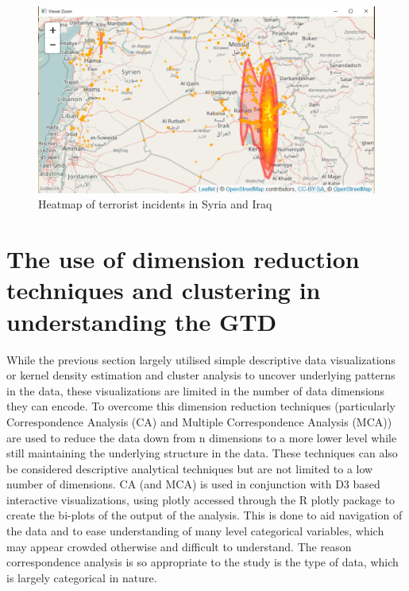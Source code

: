 \begin{figure}[t]
\includegraphics[width=15cm]{Peters_experiment_markdown_files/figure-latex/Capture_KDE_Leaflet_2015_Deaths_Iraq_Syria.png}
\caption{Heatmap of terrorist incidents in Syria and Iraq}
\label{fig:iraqsyriakde}
\centering
\end{figure}
 
\section{The use of dimension reduction techniques and clustering in understanding the GTD}\label{viewing-deaths-by-attack-vector-type} 

While the previous section largely utilised simple descriptive data visualizations or kernel density estimation and cluster analysis to uncover underlying patterns in the data, these visualizations are limited in the number of data dimensions they can encode. To overcome this dimension reduction techniques (particularly Correspondence Analysis (CA) and Multiple Correspondence Analysis (MCA)) are used to reduce the data down from n dimensions to a more lower level while still maintaining the underlying structure in the data. These techniques can also be considered descriptive analytical techniques but are not limited to a low number of dimensions. CA (and MCA) is used in conjunction with D3 \citep{bostock2012d3} based interactive visualizations, using plotly \citep{plotlymanual2016} accessed through the R plotly package to create the bi-plots of the output of the analysis. This is done to aid navigation of the data and to ease understanding of many level categorical variables, which may appear crowded otherwise and difficult to understand. The reason correspondence  analysis is so appropriate to the study is the type of  data, which is largely categorical in nature. 

